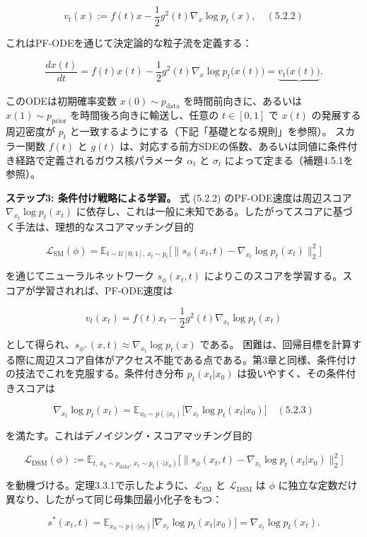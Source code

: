 \[
v_t(x):=f(t)x-\frac{1}{2}g^2(t)\nabla_x\log p_t(x), \quad (5.2.2)
\]


これはPF-ODEを通じて決定論的な粒子流を定義する：

\[
\frac{dx(t)}{dt}=f(t)x(t)-\frac{1}{2}g^2(t)\nabla_x\log p_t\bigl(x(t)\bigr)=\underbrace{v_t\bigl(x(t)\bigr)}_{}.
\]


このODEは初期確率変数 $x(0)\sim p_{\mathrm{data}}$ を時間前向きに、あるいは $x(1)\sim p_{\mathrm{prior}}$ を時間後ろ向きに輸送し、任意の $t\in[0,1]$ で $x(t)$ の発展する周辺密度が $p_t$ と一致するようにする（下記「基礎となる規則」を参照）。
スカラー関数 $f(t)$ と $g(t)$ は、対応する前方SDEの係数、あるいは同値に条件付き経路で定義されるガウス核パラメータ $\alpha_t$ と $\sigma_t$ によって定まる（補題4.5.1を参照）。

\textbf{ステップ3: 条件付け戦略による学習。} 式 (5.2.2) のPF-ODE速度は周辺スコア $\nabla_{x_t}\log p_t(x_t)$ に依存し、これは一般に未知である。したがってスコアに基づく手法は、理想的なスコアマッチング目的

\[
\mathcal{L}_{\mathrm{SM}}(\phi)=\mathbb{E}_{t\sim\mathcal{U}[0,1],\,x_t\sim p_t}\bigl[\|s_\phi(x_t,t)-\nabla_{x_t}\log p_t(x_t)\|_2^2\bigr]
\]


を通じてニューラルネットワーク $s_\phi(x_t,t)$ によりこのスコアを学習する。スコアが学習されれば、PF-ODE速度は

\[
v_t(x_t)=f(t)x_t-\frac{1}{2}g^2(t)\nabla_{x_t}\log p_t(x_t)
\]


として得られ、$s_{\phi^\times}(x,t)\approx\nabla_{x_t}\log p_t(x)$ である。
困難は、回帰目標を計算する際に周辺スコア自体がアクセス不能である点である。第3章と同様、条件付けの技法でこれを克服する。条件付き分布 $p_t(x_t|x_0)$ は扱いやすく、その条件付きスコアは

\[
\nabla_{x_t}\log p_t(x_t)=\mathbb{E}_{x_0\sim p(\cdot|x_t)}\bigl[\nabla_{x_t}\log p_t(x_t|x_0)\bigr] \quad (5.2.3)
\]


を満たす。これはデノイジング・スコアマッチング目的

\[
\mathcal{L}_{\mathrm{DSM}}(\phi):=\mathbb{E}_{t,\,x_0\sim p_{\mathrm{data}},\,x_t\sim p_t(\cdot|x_0)}\bigl[\|s_\phi(x_t,t)-\nabla_{x_t}\log p_t(x_t|x_0)\|_2^2\bigr]
\]


を動機づける。定理3.3.1で示したように、$\mathcal{L}_{\mathrm{SM}}$ と $\mathcal{L}_{\mathrm{DSM}}$ は $\phi$ に独立な定数だけ異なり、したがって同じ母集団最小化子をもつ：

\[
s^*(x_t,t)=\mathbb{E}_{x_0\sim p(\cdot|x_t)}\bigl[\nabla_{x_t}\log p_t(x_t|x_0)\bigr]=\nabla_{x_t}\log p_t(x_t).
\]


